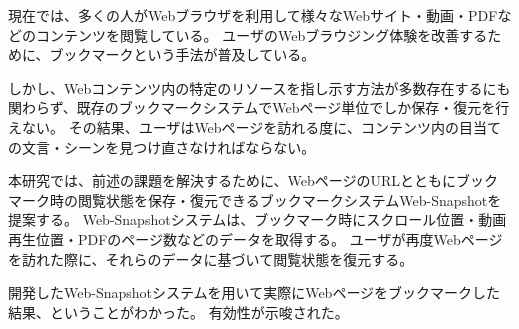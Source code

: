 \begin{jabstract}

  現在では、多くの人がWebブラウザを利用して様々なWebサイト・動画・PDFなどのコンテンツを閲覧している。
  ユーザのWebブラウジング体験を改善するために、ブックマークという手法が普及している。

  しかし、Webコンテンツ内の特定のリソースを指し示す方法が多数存在するにも関わらず、既存のブックマークシステムでWebページ単位でしか保存・復元を行えない。
  その結果、ユーザはWebページを訪れる度に、コンテンツ内の目当ての文言・シーンを見つけ直さなければならない。

  本研究では、前述の課題を解決するために、WebページのURLとともにブックマーク時の閲覧状態を保存・復元できるブックマークシステムWeb-Snapshotを提案する。
  Web-Snapshotシステムは、ブックマーク時にスクロール位置・動画再生位置・PDFのページ数などのデータを取得する。
  ユーザが再度Webページを訪れた際に、それらのデータに基づいて閲覧状態を復元する。

  開発したWeb-Snapshotシステムを用いて実際にWebページをブックマークした結果、ということがわかった。
  有効性が示唆された。

\end{jabstract}
